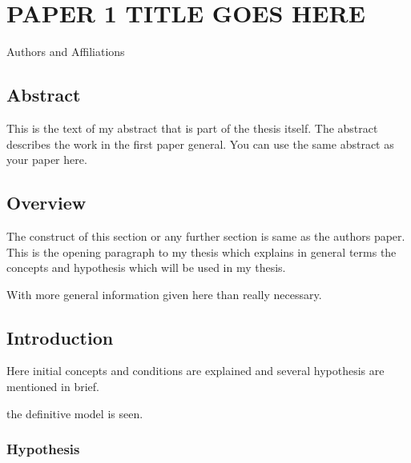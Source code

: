 \chapter{PAPER 1 TITLE GOES HERE}
\label{polymer_fibers}

\begin{center}
    Authors and Affiliations %
\end{center}

\section{Abstract}
This is the text of my abstract that is part of the thesis itself.
The abstract describes the work in the first paper general. You can use the same abstract as your paper here.



\section{Overview}

The  construct of this section or any further section is same as the authors paper.
This is the opening paragraph to my thesis which
explains in general terms the concepts and hypothesis
which will be used in my thesis.

With more general information given here than really
necessary.

\section{Introduction}

Here initial concepts and conditions are explained and
several hypothesis are mentioned in brief.

\cite{kleeHellyTheoremIts1963} the definitive model is seen.

\subsection{Hypothesis}


